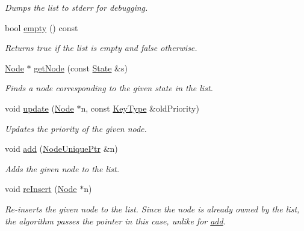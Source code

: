 \begin{DoxyCompactItemize}
\begin{DoxyCompactList}\small\item\em Dumps the list to {\ttfamily stderr} for debugging. \end{DoxyCompactList}\item 
bool \hyperlink{structOpenClosedList_a8ee903cf8b7a67b6ddf2c8ce95434aac}{empty} () const 
\begin{DoxyCompactList}\small\item\em Returns {\ttfamily true} if the list is empty and {\ttfamily false} otherwise. \end{DoxyCompactList}\item 
\hyperlink{structOpenClosedList_ad537fb81d3482e41e8ad0ee9288819c9}{Node} $\ast$ \hyperlink{structOpenClosedList_a8394a74e291e9d3d2b5070f523ee5106}{get\+Node} (const \hyperlink{structOpenClosedList_a64fd043b1581700f6de43d540f1c39d6}{State} \&s)
\begin{DoxyCompactList}\small\item\em Finds a node corresponding to the given state in the list. \end{DoxyCompactList}\item 
void \hyperlink{structOpenClosedList_adfd321b6bb0fa634bb21a041d6f96ce6}{update} (\hyperlink{structOpenClosedList_ad537fb81d3482e41e8ad0ee9288819c9}{Node} $\ast$n, const \hyperlink{structOpenClosedList_a396ae2c0d03cce359af0d6fd314f663c}{Key\+Type} \&old\+Priority)
\begin{DoxyCompactList}\small\item\em Updates the priority of the given node. \end{DoxyCompactList}\item 
void \hyperlink{structOpenClosedList_a28402cd4c615a9713f7080ea25eaedd5}{add} (\hyperlink{structOpenClosedList_a9dbc60979a564fc7d5d0ff563f5406a1}{Node\+Unique\+Ptr} \&n)
\begin{DoxyCompactList}\small\item\em Adds the given node to the list. \end{DoxyCompactList}\item 
void \hyperlink{structOpenClosedList_af303ca14da9e5c6c80b51d660d0c8959}{re\+Insert} (\hyperlink{structOpenClosedList_ad537fb81d3482e41e8ad0ee9288819c9}{Node} $\ast$n)
\begin{DoxyCompactList}\small\item\em Re-\/inserts the given node to the list. Since the node is already owned by the list, the algorithm passes the pointer in this case, unlike for \hyperlink{structOpenClosedList_a28402cd4c615a9713f7080ea25eaedd5}{add}. \end{DoxyCompactList}\item 

\end{DoxyCompactItemize}
